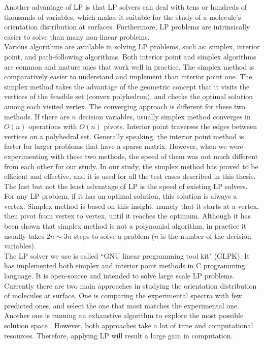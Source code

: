 Another advantage of LP is that LP solvers can deal with tens or hundreds of thousands of variables, which makes it suitable for the study of a molecule's orientation distribution at surfaces. Furthermore, LP problems are intrinsically easier to solve than many non-linear problems. \\

Various algorithms are available in solving LP problems, such as: simplex, interior point, and path-following algorithms. Both interior point and simplex algorithms are common and mature ones that work well in practice. The simplex method is comparatively easier to understand and implement than interior point one. The simplex method takes the advantage of the geometric concept that it visits the vertices of the feasible set (convex polyhedron), and checks the optimal solution among each visited vertex. The converging approach is different for these two methods. If there are $n$ decision variables, usually simplex method converges in $O(n)$ operations with $O(n)$ pivots. Interior point traverses the edges between vertices on a polyhedral set. Generally speaking, the interior point method is faster for larger problems that have a sparse matrix. However, when we were experimenting with these two methods, the speed of them was not much different from each other for our study. In our study, the simplex method has proved to be efficient and effective, and it is used for all the test cases described in this thesis. \\

The last but not the least advantage of LP is the speed of existing LP solvers. For any LP problem, if it has an optimal solution, this solution is always a vertex. Simplex method is based on this insight, namely that it starts at a vertex, then pivot from vertex to vertex, until it reaches the optimum. Although it has been shown that simplex method is not a polynomial algorithm, in practice it usually takes $2n\sim3n$ steps to solve a problem ($n$ is the number of the decision variables). \\

The LP solver we use is called ``GNU linear programming tool kit" (GLPK). It has implemented both simplex and interior point methods in C programming language. It is open-source and intended to solve large scale LP problems. \\

Currently there are two main approaches in studying the orientation distribution of molecules at surface. One is comparing the experimental spectra with few predicted ones, and select the one that most matches the experimental one. Another one is running an exhaustive algorithm to explore the most possible solution space \cite{hore0033-rotations}. However, both approaches take a lot of time and computational resources. Therefore, applying LP will result a large gain in computation.\\


